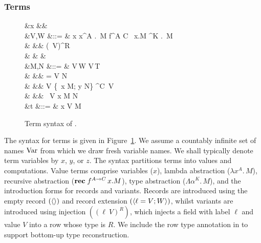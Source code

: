 \documentclass[12pt,phd,lfcs,twoside,openright,logo,leftchapter,normalheadings]{infthesis}
\theoremstyle{plain}
\theoremstyle{definition}
\begin{document}
\subsubsection{Terms}
\label{sec:base-language-terms}
%
\begin{figure}
\begin{syntax}
     &x \in \VarCat&&\\
        &V,W \in \ValCat  &::= & x
                                        \mid \lambda x^A .\, M \mid \Rec \; f^{A \to C} \, x.M \mid \Lambda \alpha^K .\, M\\
                     &                 &\mid& \Record{} \mid {} \mid (\ell~V)^R \\
                     &     &    &\\
  &M,N \in \CompCat  &::= & V\,W \mid V\,T\\
                     &                  &\mid& \Let\;  = V \; \In \; N\\
                     &                  &\mid& \Case\; V \{\ell~x \mapsto M; y \mapsto N\} \mid \Absurd^C~V\\
                     &                  &\mid& \Return~V \mid \Let \; x \revto M \; \In \; N\\
         &t \in \TermCat    &::= & x \mid V \mid M
\end{syntax}

\caption{Term syntax of \BCalc{}.}
\label{fig:base-language-term-syntax}
\end{figure}
%
The syntax for terms is given in
Figure~\ref{fig:base-language-term-syntax}. We assume a countably
infinite set of names $\textrm{Var}$ from which we draw fresh variable
names. We shall typically denote term variables by $x$, $y$, or $z$.
%
The syntax partitions terms into values and computations.
%
Value terms comprise variables ($x$), lambda abstraction
($\lambda x^A . \, M$), recursive abstraction
($\mathbf{rec}\;f^{A \to C}\,x.M$), type abstraction
($\Lambda \alpha^K . \, M$), and the introduction forms for records
and variants. Records are introduced using the empty record
$(\langle  \rangle)$ and record extension $(\langle \ell = V; W \rangle)$, whilst
variants are introduced using injection $((\ell~V)^R)$, which injects
a field with label $\ell$ and value $V$ into a row whose type is
$R$. We include the row type annotation in to support bottom-up type
reconstruction.
\end{document}
